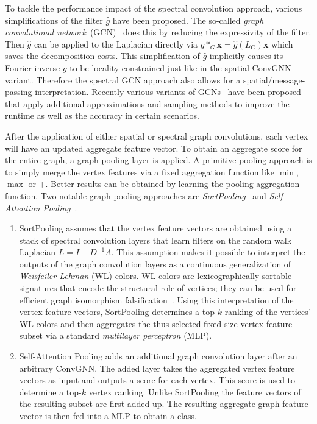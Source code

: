 \documentclass[12pt]{scrartcl}
\begin{document}
\begin{enumerate}[label=\textbf{\arabic*.}]
\begin{enumerate}[label=\textbf{\alph*)}]
				To tackle the performance impact of the spectral convolution approach, various simplifications of the filter $\hat{g}$ have been proposed.
				The so-called \textit{graph convolutional network}~(GCN)~\cite{Kipf2017} does this by reducing the expressivity of the filter.
				Then $\hat{g}$ can be applied to the Laplacian directly via $g *_G \bm{x} = \hat{g}(L_G) \bm{x}$ which saves the decomposition costs.
				This simplification of $\hat{g}$ implicitly causes its Fourier inverse $g$ to be locality constrained just like in the spatial ConvGNN variant.
				Therefore the spectral GCN approach also allows for a spatial/message-passing interpretation.
				Recently various variants of GCNs~\cite{Hamilton2017}\cite{Chen2018}\cite{Chen2017}\cite{Chiang2019} have been proposed that apply additional approximations and sampling methods to improve the runtime as well as the accuracy in certain scenarios.
		\end{enumerate}
		After the application of either spatial or spectral graph convolutions, each vertex will have an updated aggregate feature vector.
		To obtain an aggregate score for the entire graph, a graph pooling layer is applied.
		A primitive pooling approach is to simply merge the vertex features via a fixed aggregation function like $\min$, $\max$ or $+$.
		Better results can be obtained by learning the pooling aggregation function.
		Two notable graph pooling approaches are \textit{SortPooling}~\cite{Zhang2018} and \textit{Self-Attention Pooling}~\cite{Lee2019}.
		\begin{enumerate}
			\item SortPooling assumes that the vertex feature vectors are obtained using a stack of spectral convolution layers that learn filters on the random walk Laplacian $L = I - D^{-1} A$.
				This assumption makes it possible to interpret the outputs of the graph convolution layers as a continuous generalization of \textit{Weisfeiler-Lehman} (WL) colors.
				WL colors are lexicographically sortable signatures that encode the structural role of vertices; they can be used for efficient graph isomorphism falsification~\cite{Weisfeiler1968}.
				Using this interpretation of the vertex feature vectors, SortPooling determines a top-$k$ ranking of the vertices' WL colors and then aggregates the thus selected fixed-size vertex feature subset via a standard \textit{multilayer perceptron} (MLP).
			\item Self-Attention Pooling adds an additional graph convolution layer after an arbitrary ConvGNN.\@
				The added layer takes the aggregated vertex feature vectors as input and outputs a score for each vertex.
				This score is used to determine a top-$k$ vertex ranking.
				Unlike SortPooling the feature vectors of the resulting subset are first added up.
				The resulting aggregate graph feature vector is then fed into a MLP to obtain a class.
		\end{enumerate}
\end{enumerate}
\end{document}
